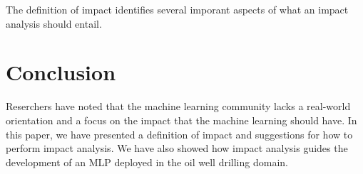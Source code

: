 \documentclass{article}
\theoremstyle{theorem}
\theoremstyle{definition}
\begin{document}
The definition of impact identifies several imporant aspects of what an impact analysis should entail.






\section{Conclusion}
\label{sec:conclusion}
Reserchers have noted that the machine learning community lacks a real-world orientation and a focus on the impact that the machine learning should have.
In this paper, we have presented a definition of impact and suggestions for how to perform impact analysis.
We have also showed how impact analysis guides the development of an MLP deployed in the oil well drilling domain.



%
%
%
%
%
%

%
%
%
%
%
%
%
%
%
%
%
%
%
%
%
%



\end{document}
